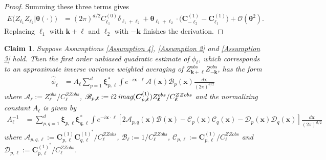 \documentclass[10pt,noinfoline]{imsart}
\newtheorem{claim}{Claim}
\newcommand{\bs}{\boldsymbol}
\begin{document}
\begin{proof}
Summing these three terms gives
\begin{align*}
E\big(Z_{\bs \ell_1}Z_{\bs \ell_2}|\bs \theta(\cdot)\big) &= {(2\pi)}^{d/2}C^{(0)}_{\bs \ell_1} \delta_{\bs \ell_1+\bs \ell_2}
+ \bs\theta_{\bs \ell_1+\bs \ell_2}\cdot\big(\bs C^{(1)}_{-\bs \ell_2} -\bs C_{\bs \ell_1}^{(1)}\big) + \mathcal O(\bs\theta^2).
\end{align*}
Replacing $\bs \ell_1$ with  $\bs k+\bs \ell$  and $\bs \ell_2$ with $-\bs k$ finishes the derivation.
\end{proof}



%
%

\begin{claim}\label{appendix, claim: quad est derivations}
Suppose Assumptions \ref{Assumption 4}, \ref{Assumption 2} and \ref{Assumption 3} hold. Then the first order unbiased quadratic estimate of $\phi_{\bs \ell}$, which corresponds to an approximate inverse variance weighted averaging of $Z_{\bs k+\bs \ell}^{obs}Z_{-\bs k}^{obs}$, has the form
    \begin{align}
        \label{appendix-claim def of quad est}
        \hat\phi_{\bs \ell} &=   A_{\bs \ell}\sum_{p=1}^d \bs\xi^*_{p,\bs\ell} \int
        e^{-i\bs x\cdot\bs\ell}
        \mathscr A(\bs x)\mathscr B_{p}(\bs x) \frac{d\bs x}{{(2\pi)}^{d/2}}
    \end{align}
    where $\mathscr A_{\bs \ell}:= Z^{obs}_{\bs \ell}/ C^{ZZobs}_{\bs \ell}$,  $\mathscr B_{p,\bs\ell} := i 2 \textit{\,imag}(\bs C^{(1)}_{p,\bs \ell}) Z^{obs}_{\bs\ell} / C^{ZZobs}_{\bs \ell}$ and 
    the normalizing constant
    $A_{\bs\ell}$ is given by
    \begin{align}
        \label{appendix-claim def of Aℓinv}
        A_{\bs\ell}^{-1} &= \sum_{p,q = 1}^d\bs\xi_{p,\bs \ell}\bs\xi^*_{q,\bs \ell}\int  e^{-i\bs x\cdot\bs\ell} \left[2\mathscr A_{p,q}(\bs x)\mathscr B(\bs x)  - \mathscr C_{p}(\bs x)\mathscr C_{q}(\bs x) -  \mathscr D_{p}(\bs x)\mathscr D_{q}(\bs x)\right]  \frac{d\bs x}{{(2\pi)}^{d/2}}
    \end{align}
    where $\mathscr A_{p,q, \bs \ell}:= \bs C^{(1)}_{p,\bs\ell} \bs C^{{(1)}^*}_{q,\bs\ell}  / C^{ZZobs}_{\bs\ell}$, $\mathscr B_{\bs\ell}:= 1/C^{ZZobs}_{\bs\ell}$, $\mathscr C_{p,\bs\ell}:= \bs C^{(1)}_{p,\bs\ell}  / C^{ZZobs}_{\bs\ell}$ and $\mathscr D_{p,\bs\ell}:= \bs C^{{(1)}^*}_{p,\bs\ell}  / C^{ZZobs}_{\bs\ell}$.
\end{claim}
\end{document}
